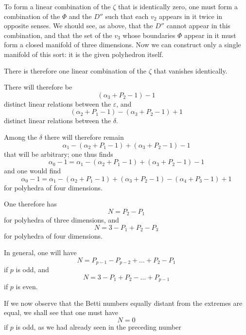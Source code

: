 \documentclass{article}
\begin{document}
To form a linear combination of the $\zeta$ that is identically zero, one must form a combination of the $\Phi$ and the $D''$ such that each $v_{2}$ appears in it twice in opposite senses. We should see, as above, that the $D''$ cannot appear in this combination, and that the set of the $v_{3}$ whose boundaries $\Phi$ appear in it must form a closed manifold of three dimensions. Now we can construct only a single manifold of this sort: it is the given polyhedron itself.

There is therefore one linear combination of the $\zeta$ that vanishes identically.

There will therefore be
\[ (\alpha_{3} + P_{2} - 1) - 1 \]
distinct linear relations between the $\varepsilon$, and
\[ (\alpha_{2} + P_{1} - 1) - (\alpha_{3} + P_{2} - 1) + 1 \]
distinct linear relations between the $\delta$.

Among the $\delta$ there will therefore remain
\[ \alpha_{1} - (\alpha_{2} + P_{1} - 1) + (\alpha_{3} + P_{2} - 1) - 1 \]
that will be arbitrary; one thus finds
\[ \alpha_{0} - 1 = \alpha_{1} - (\alpha_{2} + P_{1} - 1) + (\alpha_{3} + P_{2} - 1) - 1 \]
and one would find
\[ \alpha_{0} - 1 = \alpha_{1} - (\alpha_{2} + P_{1} - 1) + (\alpha_{3} + P_{2} - 1) - (\alpha_{4} + P_{3} - 1) + 1 \]
for polyhedra of four dimensions.

One therefore has
\[ N = P_{2} - P_{1} \]
for polyhedra of three dimensions, and
\[ N = 3 - P_{1} + P_{2} - P_{3} \]
for polyhedra of four dimensions.

In general, one will have
\[ N = P_{p-1} - P_{p-2} + \ldots + P_{2} - P_{1} \]
if $p$ is odd, and
\[ N = 3 - P_{1} + P_{2} - \ldots + P_{p-1} \]
if $p$ is even.

If we now observe that the Betti numbers equally distant from the extremes are equal, we shall see that one must have
\[ N = 0 \]
if $p$ is odd, as we had already seen in the preceding number
\end{document}
